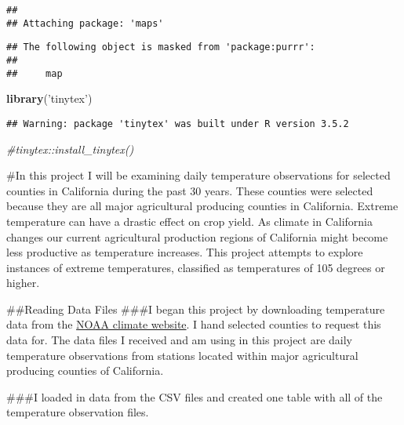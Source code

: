 \documentclass[]{article}
\newenvironment{Shaded}{\begin{snugshade}}{\end{snugshade}}
\newcommand{\CommentTok}[1]{\textcolor[rgb]{0.56,0.35,0.01}{\textit{#1}}}
\newcommand{\KeywordTok}[1]{\textcolor[rgb]{0.13,0.29,0.53}{\textbf{#1}}}
\newcommand{\NormalTok}[1]{#1}
\newcommand{\StringTok}[1]{\textcolor[rgb]{0.31,0.60,0.02}{#1}}
\begin{document}
\begin{verbatim}
## 
## Attaching package: 'maps'
\end{verbatim}

\begin{verbatim}
## The following object is masked from 'package:purrr':
## 
##     map
\end{verbatim}

\begin{Shaded}
\begin{Highlighting}[]
\KeywordTok{library}\NormalTok{(}\StringTok{'tinytex'}\NormalTok{)}
\end{Highlighting}
\end{Shaded}

\begin{verbatim}
## Warning: package 'tinytex' was built under R version 3.5.2
\end{verbatim}

\begin{Shaded}
\begin{Highlighting}[]
\CommentTok{#tinytex::install_tinytex()}
\end{Highlighting}
\end{Shaded}

\#In this project I will be examining daily temperature observations for
selected counties in California during the past 30 years. These counties
were selected because they are all major agricultural producing counties
in California. Extreme temperature can have a drastic effect on crop
yield. As climate in California changes our current agricultural
production regions of California might become less productive as
temperature increases. This project attempts to explore instances of
extreme temperatures, classified as temperatures of 105 degrees or
higher.

\#\#Reading Data Files \#\#\#I began this project by downloading
temperature data from the \href{https://www.climate.gov/maps-data}{NOAA
climate website}. I hand selected counties to request this data for. The
data files I received and am using in this project are daily temperature
observations from stations located within major agricultural producing
counties of California.

\#\#\#I loaded in data from the CSV files and created one table with all
of the temperature observation files.
\end{document}
